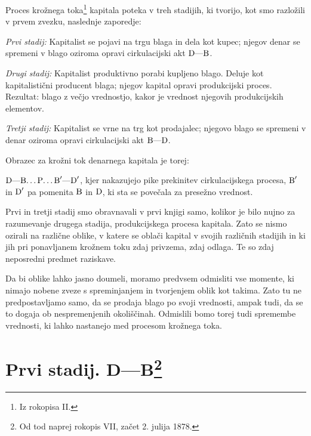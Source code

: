 \documentclass[kapital_02.tex]{subfiles}
\begin{document}
Proces krožnega toka\footnote{Iz rokopisa II.} kapitala poteka v treh stadijih, ki tvorijo, kot smo razložili v prvem zvezku, naslednje zaporedje:

\emph{Prvi stadij:} Kapitalist se pojavi na trgu blaga in dela kot kupec; njegov denar se spremeni v blago oziroma opravi cirkulacijski akt \( \textrm{D}\textrm{---}\textrm{B} \).

\emph{Drugi stadij:} Kapitalist produktivno porabi kupljeno blago. Deluje kot kapitalistični producent blaga; njegov kapital opravi produkcijski proces. Rezultat: blago z večjo vrednostjo, kakor je vrednost njegovih produkcijskih elementov.

\emph{Tretji stadij:} Kapitalist se vrne na trg kot prodajalec; njegovo blago se spremeni v denar oziroma opravi cirkulacijski akt \( \textrm{B}\textrm{---}\textrm{D} \).

Obrazec za krožni tok denarnega kapitala je torej:

\( \textrm{D}\textrm{---}\textrm{B}\textrm{\dots}\textrm{P}\textrm{\dots}\textrm{B}'\textrm{---}\textrm{D}' \), kjer nakazujejo pike prekinitev cirkulacijskega procesa, \( \textrm{B}' \) in \( \textrm{D}' \) pa pomenita \( \textrm{B} \) in \( \textrm{D} \), ki sta se povečala za presežno vrednost.

Prvi in tretji stadij smo obravnavali v prvi knjigi samo, kolikor je bilo nujno za razumevanje drugega stadija, produkcijskega procesa kapitala. Zato se nismo ozirali na različne oblike, v katere se oblači kapital v svojih različnih stadijih in ki jih pri ponavljanem krožnem toku zdaj privzema, zdaj odlaga. Te so zdaj neposredni predmet raziskave.

Da bi oblike lahko jasno doumeli, moramo predvsem odmisliti vse momente, ki nimajo nobene zveze s spreminjanjem in tvorjenjem oblik kot takima. Zato tu ne predpostavljamo samo, da se prodaja blago po svoji vrednosti, ampak tudi, da se to dogaja ob nespremenjenih okoliščinah. Odmislili bomo torej tudi spremembe vrednosti, ki lahko nastanejo med procesom krožnega toka.

\section{Prvi stadij. D---B\footnote{Od tod naprej rokopis VII, začet 2. julija 1878.}}
\end{document}
